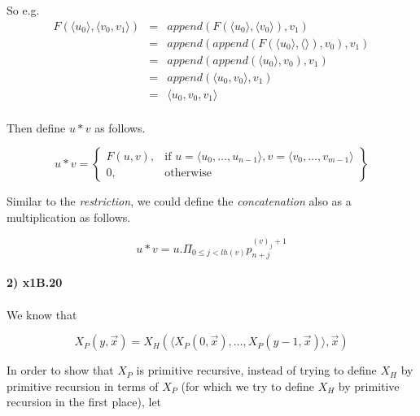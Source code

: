 \documentclass{article}
\begin{document}
So e.g. \[
\begin{array}{rcl}
F(\langle u_0 \rangle,\langle v_0, v_1 \rangle) & = & append(F(\langle u_0 \rangle, \langle v_0 \rangle), v_1) \\

& = & append(append(F(\langle u_0 \rangle,\langle\rangle), v_0), v_1) \\

& = & append(append(\langle u_0 \rangle, v_0), v_1) \\

& = & append(\langle u_0, v_0 \rangle, v_1) \\

& = & \langle u_0,v_0,v_1 \rangle \\

\end{array}
\]

Then define $u * v$ as follows.

\[
u * v = \left\{\begin{array}{lr}
    F(u,v), & \text{if } u = \langle u_0, \ldots, u_{n-1} \rangle, v = \langle v_0, \ldots, v_{m-1} \rangle \\
    0, & \text{otherwise}
  \end{array}\right\}
\]

Similar to the \textit{restriction}, we could define the \textit{concatenation} also as a multiplication as follows.

\begin{equation*}
u * v = u.\Pi_{0\leq j < lh(v)} p_{n+j}^{(v)_j+1}
\end{equation*}
  
\paragraph{2) x1B.20}

\paragraph{} We know that

\begin{equation*}
  X_P(y,\overrightarrow{x}) = X_H(\langle X_P(0,\overrightarrow{x}), \ldots, X_P(y-1,\overrightarrow{x}) \rangle, \overrightarrow{x})
\end{equation*}

In order to show that $X_P$ is primitive recursive, instead of trying to define $X_H$ by primitive recursion in terms of $X_P$ (for which we try to define $X_H$ by primitive recursion in the first place), let
\end{document}
